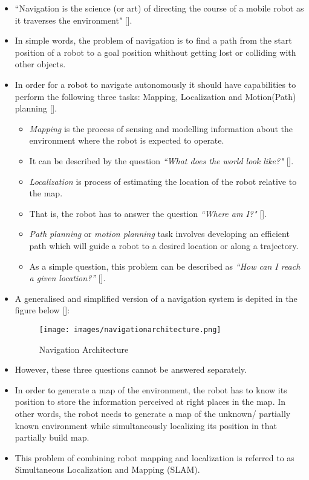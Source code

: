 \begin{itemize}
 \item ``{Navigation} is the science (or art) of directing the course of a mobile robot as it traverses the environment"  [].
 \item In simple words, the problem of navigation is to find a path from the start position of a robot to a goal position whithout getting lost or colliding with other objects.
 \item In order for a robot to navigate autonomously it should have capabilities to perform the following three tasks: Mapping, Localization
and Motion(Path) planning [].
  \begin{itemize}
    \item \textit{Mapping} is the process of sensing and modelling information about the environment where the robot is expected to operate. 
    \item It can be described by the question \textit{``What does the world look like?"} [].\\
    \item \textit{Localization} is process of estimating the location of the robot relative to the map. 
    \item That is, the robot has to answer the question \textit{``Where am I?"} [].\\
    \item \textit{Path planning} or \textit{motion planning} task involves developing an efficient path which will guide a robot to a desired location or along a trajectory. 
    \item As a simple question, this problem can be described as \textit{``How can I reach a given location?”} [].
  \end{itemize}
  \item A generalised and simplified version of a navigation system is depited in the figure below []:
\begin{figure}[htbp] %
   \centering
   \texttt{[image: images/navigationarchitecture.png]} 
   \caption{Navigation Architecture}
   \label{Figure: Robot navigation System. The three tasks the robot must accomplish (highlighted in cyan) are in between a high-level layer and a low-level layer.}
\end{figure}


 \item However, these three questions cannot be answered separately. 
 \item In order to generate a map of the environment, the robot has to know its position to store the information perceived at right places in the map. In other words, the robot needs to generate a map of the unknown/ partially known 
environment while simultaneously localizing its position in that partially build map. 
 \item This problem of combining robot mapping and localization is referred to as Simultaneous Localization and Mapping (SLAM).\\
\end{itemize} 
